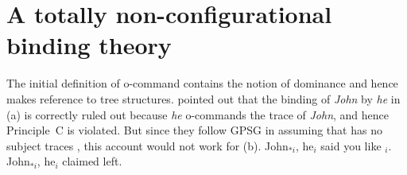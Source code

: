 \documentclass[output=paper,biblatex,babelshorthands,newtxmath,draftmode,colorlinks,citecolor=brown]{langscibook}
\begin{document}
\section{A totally non-configurational binding theory}
\label{sec-totally-non-configurational-BT}

The initial definition of o-command contains the notion of dominance and hence makes reference to
tree structures. \citet[]{ps2} pointed out that the binding of \emph{John} by \emph{he} in
(a) is correctly ruled out because \emph{he} o-commands the trace of \emph{John}, and hence
Principle~C is violated. But since they follow GPSG in assuming that  has no subject traces
\citep[Chapter~4.4]{ps2}, this account would not work for (b). 
\eal
\label{ex-subject-object-extraction-traceless}
\ex John$_{*i}$, he$_i$ said you like \trace$_i$.
\ex John$_{*i}$, he$_i$ claimed left.
\zl
\end{document}
